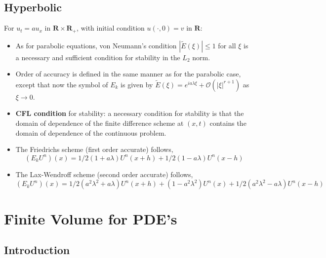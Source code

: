 \documentclass[oneside,a4paper,11pt]{report}
\begin{document}
\chapter{Hyperbolic}
For $u_t = au_x$ in $\mathbf{R}\times\mathbf{R_+}$, with initial condition $u(\cdot,0) = v$ in $\mathbf{R}$:
\begin{itemize}
\item As for parabolic equations, von Neumann's condition $|\tilde{E}(\xi)| \le 1$ for all $\xi$ is a necessary and sufficient condition for stability in the $L_2$ norm. 

\item Order of accuracy is defined in the same manner as for the parabolic case, except that now the symbol of $E_k$ is given by $\tilde{E}(\xi) = e^{ia\lambda\xi} + \mathcal{O}(|\xi|^{r+1})$ as $\xi \to 0$.

\item \textbf{CFL condition} for stability: a necessary condition for stability is that the domain of dependence of the finite difference scheme at $(x,t)$ contains the domain of dependence of the continuous problem.

\item The Friedrichs scheme (first order accurate) follows,
$$(E_kU^n)(x) = 1/2(1+a\lambda)U^n(x+h) + 1/2(1-a\lambda)U^n(x-h)$$

\item The Lax-Wendroff scheme (second order accurate) follows,
$$(E_kU^n)(x) = 1/2(a^2\lambda^2+a\lambda)U^n(x+h) + (1-a^2\lambda^2)U^n(x) + 1/2(a^2\lambda^2-a\lambda)U^n(x-h)$$
\end{itemize}


\part{Finite Volume for PDE's}

\chapter{Introduction}
\end{document}
